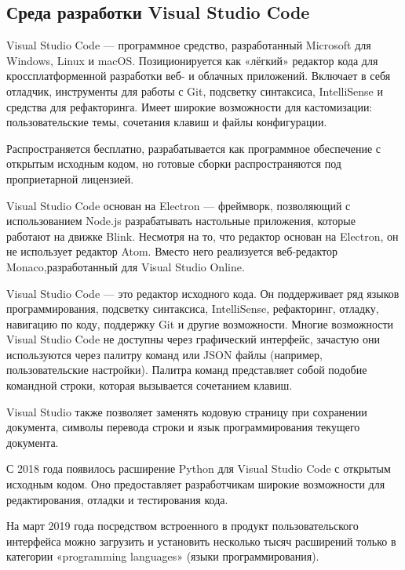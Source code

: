\subsection{Среда разработки Visual Studio Code}
\label{sec:development:ide}

Visual Studio Code — программное средство, разработанный Microsoft для Windows, Linux и macOS. Позиционируется как «лёгкий» редактор кода для кроссплатформенной разработки веб- и облачных приложений. Включает в себя отладчик, инструменты для работы с Git, подсветку синтаксиса, IntelliSense и средства для рефакторинга. Имеет широкие возможности для кастомизации: пользовательские темы, сочетания клавиш и файлы конфигурации. 

Распространяется бесплатно, разрабатывается как программное обеспечение с открытым исходным кодом, но готовые сборки распространяются под проприетарной лицензией.

Visual Studio Code основан на Electron — фреймворк, позволяющий с использованием Node.js разрабатывать настольные приложения, которые работают на движке Blink. Несмотря на то, что редактор основан на Electron, он не использует редактор Atom. Вместо него реализуется веб-редактор Monaco,разработанный для Visual Studio Online.

Visual Studio Code — это редактор исходного кода. Он поддерживает ряд языков программирования, подсветку синтаксиса, IntelliSense, рефакторинг, отладку, навигацию по коду, поддержку Git и другие возможности. Многие возможности Visual Studio Code не доступны через графический интерфейс, зачастую они используются через палитру команд или JSON файлы (например, пользовательские настройки). Палитра команд представляет собой подобие командной строки, которая вызывается сочетанием клавиш.

Visual Studio также позволяет заменять кодовую страницу при сохранении документа, символы перевода строки и язык программирования текущего документа.

С 2018 года появилось расширение Python для Visual Studio Code с открытым исходным кодом. Оно предоставляет разработчикам широкие возможности для редактирования, отладки и тестирования кода.

На март 2019 года посредством встроенного в продукт пользовательского интерфейса можно загрузить и установить несколько тысяч расширений только в категории «programming languages» (языки программирования).